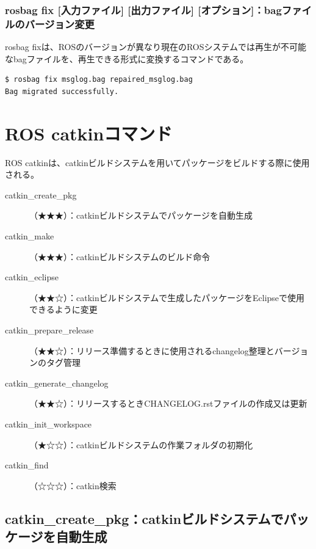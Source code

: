\subsubsection{rosbag fix [入力ファイル] [出力ファイル] [オプション]：bagファイルのバージョン変更}

rosbag fixは、ROSのバージョンが異なり現在のROSシステムでは再生が不可能なbagファイルを、再生できる形式に変換するコマンドである。

\begin{lstlisting}[language=ROS]
$ rosbag fix msglog.bag repaired_msglog.bag
Bag migrated successfully.
\end{lstlisting}

\section{ROS catkinコマンド}

ROS catkinは、catkinビルドシステムを用いてパッケージをビルドする際に使用される。

\vspace{\baselineskip}
\noindent
\begin{description}
\item[catkin\_create\_pkg]（★★★）：catkinビルドシステムでパッケージを自動生成
\item[catkin\_make]（★★★）：catkinビルドシステムのビルド命令
\item[catkin\_eclipse]（★★☆）：catkinビルドシステムで生成したパッケージをEclipseで使用できるように変更
\item[catkin\_prepare\_release]（★★☆）：リリース準備するときに使用されるchangelog整理とバージョンのタグ管理
\item[catkin\_generate\_changelog]（★★☆）：リリースするときCHANGELOG.rstファイルの作成又は更新
\item[catkin\_init\_workspace]（★☆☆）：catkinビルドシステムの作業フォルダの初期化
\item[catkin\_find]（☆☆☆）：catkin検索
\end{description}

\subsection{catkin\_create\_pkg：catkinビルドシステムでパッケージを自動生成}

